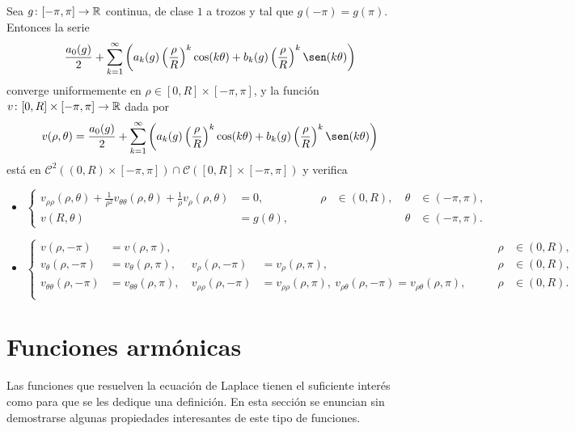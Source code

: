 \documentclass[a4paper, 12pt, extrafontsizes]{memoir}
\begin{document}
\begin{theorem}
    Sea $g \colon [-\pi,\pi] \to \mathbb R$ continua, de clase $1$ a trozos y tal que $g(-\pi)=g(\pi)$. Entonces la serie
    \[\frac{a_0(g)}{2}+ \sum_{k=1}^\infty \left(a_k(g)\left(\frac{\rho}{R}\right)^k \cos(k\theta)+b_k(g)\left(\frac{\rho}{R}\right)^k\sen(k\theta)\right)\]
    converge uniformemente en $\rho \in [0,R] \times [-\pi,\pi]$, y la función $v \colon [0,R] \times [-\pi,\pi] \to \mathbb R$ dada por
    \[v(\rho,\theta) = \frac{a_0(g)}{2}+ \sum_{k=1}^\infty \left(a_k(g)\left(\frac{\rho}{R}\right)^k \cos(k\theta)+b_k(g)\left(\frac{\rho}{R}\right)^k\sen(k\theta)\right)\]
    está en $\mathcal{C}^2((0,R) \times [-\pi,\pi]) \cap \mathcal{C}([0,R] \times [-\pi,\pi])$ y verifica
    \begin{itemize}
        \item $\displaystyle\left\{\begin{alignedat}{5}
    v_{\rho\rho}(\rho,\theta)+\frac{1}{\rho^2}v_{\theta\theta}(\rho,\theta)+\frac{1}{\rho}v_\rho(\rho,\theta) &= 0, \qquad & \rho &\in (0,R), \ &\theta &\in (-\pi,\pi), \\
    v(R,\theta) &= g(\theta), \qquad & & & \theta &\in (-\pi,\pi).
    \end{alignedat}\right.$
    \item $\displaystyle \left\{\begin{alignedat}{6}
        v(\rho,-\pi) &= v(\rho,\pi), & & \qquad & \rho &\in (0,R),  \\
        v_\theta(\rho,-\pi) &= v_\theta(\rho,\pi), & \ v_\rho(\rho,-\pi) &= v_\rho(\rho,\pi), \qquad & \rho &\in (0,R), \\
        v_{\theta\theta}(\rho,-\pi) &= v_{\theta\theta}(\rho,\pi), & \ v_{\rho\rho}(\rho,-\pi) &= v_{\rho\rho}(\rho,\pi), \ v_{\rho\theta}(\rho,-\pi) = v_{\rho\theta}(\rho,\pi), \qquad & \rho &\in (0,R).\\
    \end{alignedat}\right.$
    \end{itemize}
\end{theorem}

\section{Funciones armónicas}

Las funciones que resuelven la ecuación de Laplace tienen el suficiente interés como para que se les dedique una definición. En esta sección se enuncian sin demostrarse algunas propiedades interesantes de este tipo de funciones. 
\end{document}
